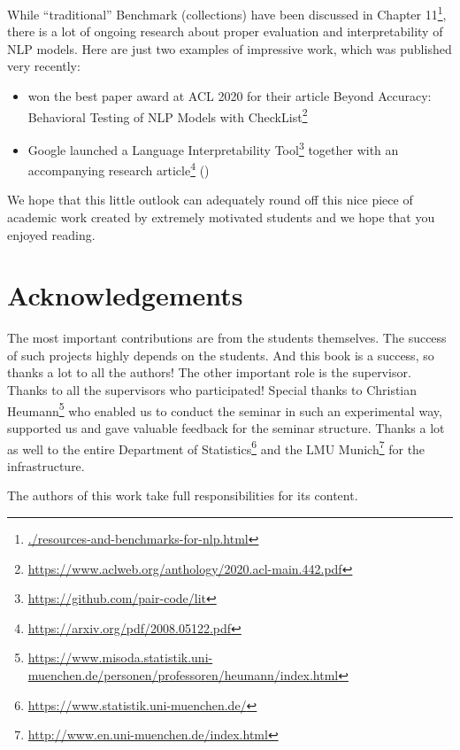 \documentclass[]{krantz}
\providecommand{\tightlist}{%
  \setlength{\itemsep}{0pt}\setlength{\parskip}{0pt}}
\renewcommand{\href}[2]{#2\footnote{\url{#1}}}
\begin{document}
While ``traditional'' Benchmark (collections) have been discussed in \href{./resources-and-benchmarks-for-nlp.html}{Chapter 11}, there is a lot of ongoing research about proper evaluation and interpretability of NLP models. Here are just two examples of impressive work, which was published very recently:

\begin{itemize}
\tightlist
\item
  \citet{ribeiro-etal-2020-beyond} won the best paper award at ACL 2020 for their article \href{https://www.aclweb.org/anthology/2020.acl-main.442.pdf}{Beyond Accuracy: Behavioral Testing of NLP Models with CheckList}
\item
  Google launched a \href{https://github.com/pair-code/lit}{Language Interpretability Tool} together with an accompanying \href{https://arxiv.org/pdf/2008.05122.pdf}{research article} (\citet{tenney2020language})
\end{itemize}

We hope that this little outlook can adequately round off this nice piece of academic work created by extremely motivated students and we hope that you enjoyed reading.

\hypertarget{acknowledgements}{%
\chapter{Acknowledgements}\label{acknowledgements}}

The most important contributions are from the students themselves.
The success of such projects highly depends on the students.
And this book is a success, so thanks a lot to all the authors!
The other important role is the supervisor.
Thanks to all the supervisors who participated!
Special thanks to \href{https://www.misoda.statistik.uni-muenchen.de/personen/professoren/heumann/index.html}{Christian Heumann} who enabled us to conduct the seminar in such an experimental way, supported us and gave valuable feedback for the seminar structure.
Thanks a lot as well to the entire \href{https://www.statistik.uni-muenchen.de/}{Department of Statistics} and the \href{http://www.en.uni-muenchen.de/index.html}{LMU Munich} for the infrastructure.

The authors of this work take full responsibilities for its content.



\backmatter
\printindex
\end{document}
